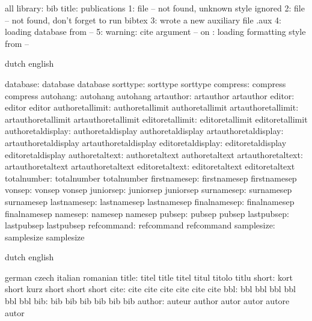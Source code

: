 \startmessages all library: bib
    title: publications
    1: file -- not found, unknown style ignored
    2: file -- not found, don't forget to run bibtex
    3: wrote a new auxiliary file \jobname.aux
    4: loading database from --
    5: warning: cite argument -- on \the{}: loading formatting style from --
\stopmessages


\startconstants        dutch                english

             database: database             database
             sorttype: sorttype             sorttype
             compress: compress             compress
             autohang: autohang             autohang
            artauthor: artauthor            artauthor
               editor: editor               editor
      authoretallimit: authoretallimit      authoretallimit
   artauthoretallimit: artauthoretallimit   artauthoretallimit
      editoretallimit: editoretallimit      editoretallimit
    authoretaldisplay: authoretaldisplay    authoretaldisplay
 artauthoretaldisplay: artauthoretaldisplay artauthoretaldisplay
    editoretaldisplay: editoretaldisplay    editoretaldisplay
       authoretaltext: authoretaltext       authoretaltext
    artauthoretaltext: artauthoretaltext    artauthoretaltext
       editoretaltext: editoretaltext       editoretaltext
          totalnumber: totalnumber          totalnumber
         firstnamesep: firstnamesep         firstnamesep
               vonsep: vonsep               vonsep
            juniorsep: juniorsep            juniorsep
           surnamesep: surnamesep           surnamesep
          lastnamesep: lastnamesep          lastnamesep
         finalnamesep: finalnamesep         finalnamesep
              namesep: namesep              namesep
               pubsep: pubsep               pubsep
           lastpubsep: lastpubsep           lastpubsep
           refcommand: refcommand           refcommand
           samplesize: samplesize           samplesize

\stopconstants

\startvariables       dutch                 english

                      german                czech
                      italian               romanian
               title: titel                 title
                      titel                 titul
                      titolo                titlu
               short: kort                  short
                      kurz                  short
                      short                 short
                cite: cite                  cite
                      cite                  cite
                      cite                  cite
                 bbl: bbl                   bbl
                      bbl                   bbl
                      bbl                   bbl
                 bib: bib                   bib
                      bib                   bib
                      bib                   bib
              author: auteur                author
                      autor                 autor
                      autore                autor

